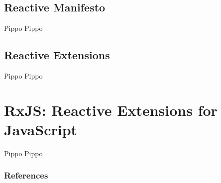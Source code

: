         \subsection{Reactive Manifesto}\label{subsec:manifest}
        \begin{frame}{\insertsectionhead}
            \begin{block}{Pippo}
                Pippo
            \end{block}
        \end{frame}

        \subsection{Reactive Extensions}\label{subsec:rx}
        \begin{frame}{\insertsectionhead}
            \begin{block}{Pippo}
                Pippo
            \end{block}
        \end{frame}

    \section{RxJS: Reactive Extensions for JavaScript}\label{sec:rxjs}
        \begin{frame}{\insertsectionhead}
            \begin{block}{Pippo}
                Pippo
            \end{block}
        \end{frame}
    \nocite{*}
    \begin{frame}[t,allowframebreaks]
        \frametitle{References}
        \printbibliography[heading=bibintoc]
    \end{frame}

